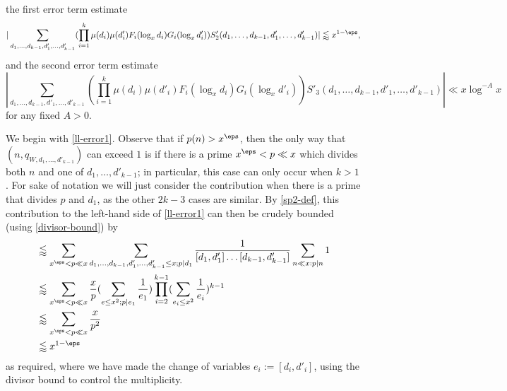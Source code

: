 the first error term estimate
\begin{equation}\label{ll-error1}
 |\sum_{d_1,\dots,d_{k-1},d'_1,\dots,d'_{k-1}} (\prod_{i=1}^k \mu(d_{i}) \mu(d'_{i}) F_{i}(\log_x d_{i}) G_{i}(\log_x d'_{i})) S'_2(d_1,\dots,d_{k-1},d'_1,\dots,d'_{k-1})| \lessapprox x^{1-\eps},
\end{equation}
and the second error term estimate
\begin{equation}\label{ll-error2}
 |\sum_{d_1,\dots,d_{k-1},d'_1,\dots,d'_{k-1}} (\prod_{i=1}^k \mu(d_{i}) \mu(d'_{i}) F_{i}(\log_x d_{i}) G_{i}(\log_x d'_{i})) S'_3(d_1,\dots,d_{k-1},d'_1,\dots,d'_{k-1})| \ll x \log^{-A} x
\end{equation}
for any fixed $A>0$.

We begin with \eqref{ll-error1}.  Observe that if $p(n) > x^\eps$, then the only way that $(n,q_{W,d_1,\dots,d'_{k-1}})$ can exceed $1$ is if there is a prime $x^\eps < p \ll x$ which divides both $n$ and one of $d_1,\dots,d'_{k-1}$; in particular, this case can only occur when $k > 1$.  For sake of notation we will just consider the contribution when there is a prime that divides $p$ and $d_1$, as the other $2k-3$ cases are similar.  By \eqref{sp2-def}, this contribution to the left-hand side of \eqref{ll-error1} can then be crudely bounded (using \eqref{divisor-bound}) by
\begin{align*}
 &\lessapprox \sum_{x^\eps < p \ll x} \sum_{d_1,\dots,d_{k-1},d'_1,\dots,d'_{k-1} \leq x; p|d_1} \frac{1}{[d_1,d'_1] \dots [d_{k-1},d'_{k-1}]} \sum_{n \ll x: p|n} 1 \\
&\lessapprox \sum_{x^\eps < p \ll x} \frac{x}{p} (\sum_{e \leq x^2; p|e_1} \frac{1}{e_1}) \prod_{i=2}^{k-1} (\sum_{e_i \leq x^2} \frac{1}{e_i})^{k-1} \\
&\lessapprox \sum_{x^\eps < p \ll x} \frac{x}{p^2} \\
&\lessapprox x^{1-\eps}
\end{align*}
as required, where we have made the change of variables $e_i := [d_i,d'_i]$, using the divisor bound to control the multiplicity.  

